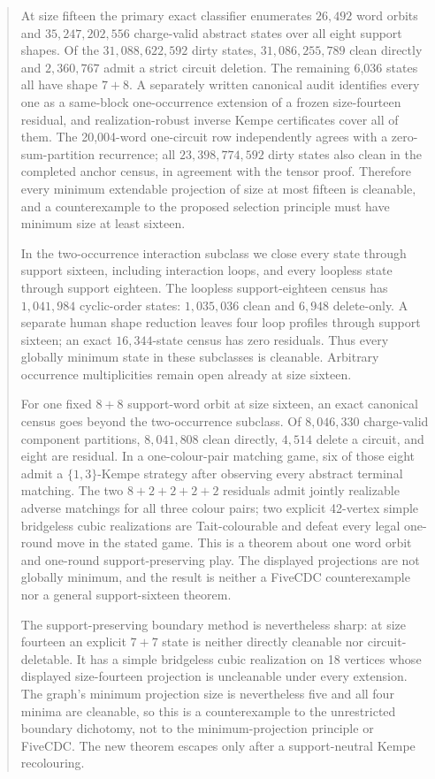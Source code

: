 \documentclass[11pt]{article}
\theoremstyle{definition}
\theoremstyle{remark}
\begin{document}
\begin{abstract}
At size fifteen the primary exact classifier enumerates \(26{,}492\)
word orbits and \(35{,}247{,}202{,}556\) charge-valid abstract states
over all eight support shapes.  Of the \(31{,}088{,}622{,}592\) dirty
states, \(31{,}086{,}255{,}789\) clean directly and \(2{,}360{,}767\)
admit a strict circuit deletion.  The remaining 6,036 states all have
shape \(7+8\).  A separately written canonical audit identifies every
one as a same-block one-occurrence extension of a frozen size-fourteen
residual, and realization-robust inverse Kempe certificates cover all of
them.  The 20,004-word one-circuit row independently agrees with a
zero-sum-partition recurrence; all \(23{,}398{,}774{,}592\) dirty states
also clean in the completed anchor census, in agreement with the tensor
proof.  Therefore every minimum extendable projection of size at most
fifteen is cleanable, and a counterexample to the proposed selection
principle must have minimum size at least sixteen.

In the two-occurrence interaction subclass we close every state through
support sixteen, including interaction loops, and every loopless state
through support eighteen.  The loopless support-eighteen census has
\(1{,}041{,}984\) cyclic-order states: \(1{,}035{,}036\) clean and
\(6{,}948\) delete-only.  A separate human shape reduction leaves four
loop profiles through support sixteen; an exact \(16{,}344\)-state
census has zero residuals.  Thus every globally minimum state in these
subclasses is cleanable.  Arbitrary occurrence multiplicities remain
open already at size sixteen.

For one fixed \(8+8\) support-word orbit at size sixteen, an exact
canonical census goes beyond the two-occurrence subclass.  Of
\(8{,}046{,}330\) charge-valid component partitions, \(8{,}041{,}808\)
clean directly, \(4{,}514\) delete a circuit, and eight are residual.
In a one-colour-pair matching game, six of those eight admit a
\(\{1,3\}\)-Kempe strategy after observing every abstract terminal
matching.  The two \(8+2+2+2+2\) residuals admit jointly realizable adverse
matchings for all three colour pairs; two explicit 42-vertex simple
bridgeless cubic realizations are Tait-colourable and defeat every legal
one-round move in the stated game.  This is a theorem about one word
orbit and one-round support-preserving play.  The displayed projections
are not globally minimum, and the result is neither a FiveCDC
counterexample nor a general support-sixteen theorem.

The support-preserving boundary method is nevertheless sharp: at size
fourteen an explicit \(7+7\) state is neither directly cleanable nor
circuit-deletable.
It has a simple bridgeless cubic realization on 18 vertices whose displayed
size-fourteen projection is uncleanable under every extension.  The graph's
minimum projection size is nevertheless five and all four minima are
cleanable, so this is a counterexample to the unrestricted boundary
dichotomy, not to the minimum-projection principle or FiveCDC.  The new
theorem escapes only after a support-neutral Kempe recolouring.


\end{abstract}
\end{document}
